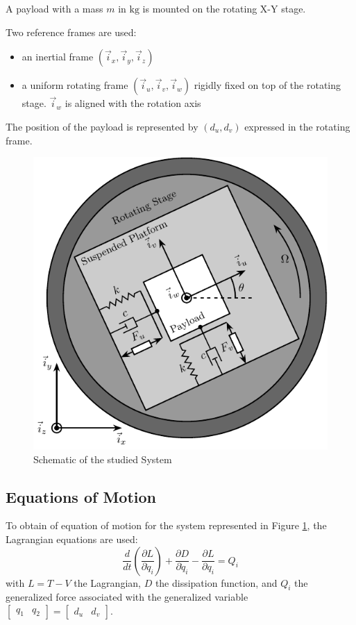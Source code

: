 \documentclass{ISMA_USD2020}
\begin{document}
A payload with a mass \(m\) in \(\si{\kilo\gram}\) is mounted on the rotating X-Y stage.

Two reference frames are used:
\begin{itemize}
\item an inertial frame \((\vec{i}_x, \vec{i}_y, \vec{i}_z)\)
\item a uniform rotating frame \((\vec{i}_u, \vec{i}_v, \vec{i}_w)\) rigidly fixed on top of the rotating stage. \(\vec{i}_w\) is aligned with the rotation axis
\end{itemize}

The position of the payload is represented by \((d_u, d_v)\) expressed in the rotating frame.

\begin{figure}[htbp]
\centering
\includegraphics[scale=1]{figs/system.pdf}
\caption{\label{fig:system}Schematic of the studied System}
\end{figure}

\subsection{Equations of Motion}
\label{sec:orga2d4956}
To obtain of equation of motion for the system represented in Figure \ref{fig:system}, the Lagrangian equations are used:
\begin{equation}
\label{eq:lagrangian_equations}
  \frac{d}{dt} \left( \frac{\partial L}{\partial \dot{q}_i} \right) + \frac{\partial D}{\partial \dot{q}_i} - \frac{\partial L}{\partial q_i} = Q_i
\end{equation}
with \(L = T - V\) the Lagrangian, \(D\) the dissipation function, and \(Q_i\) the generalized force associated with the generalized variable \(\begin{bmatrix}q_1 & q_2\end{bmatrix} = \begin{bmatrix}d_u & d_v\end{bmatrix}\).
\end{document}
